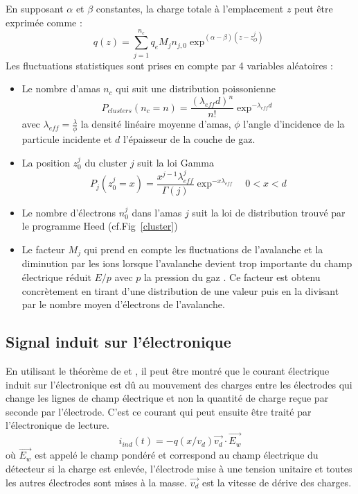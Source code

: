En supposant $\alpha$ et $\beta$ constantes, la charge totale à l'emplacement $z$ peut être exprimée comme :
\begin{equation}
q(z)=\sum_{j=1}^{n_c}q_{e}M_{j}n_{j,0}\exp^{(\alpha-\beta)(z-z_O^j)}
\end{equation}
\newpage
Les fluctuations statistiques sont prises en compte par \num{4} variables aléatoires :
\begin{itemize}[label=$\bullet$]
	\item Le nombre d'amas $n_c$ qui suit une distribution poissonienne 
	\begin{equation}
	P_{clusters}(n_c=n)=\frac{(\lambda_{eff}d)^{n}}{n!}\exp^{-\lambda_{eff}d}
	\end{equation}
	avec $\lambda_{eff}=\frac{\lambda}{\phi}$ la densité linéaire moyenne d'amas, $\phi$ l'angle d'incidence de la particule incidente et $d$ l'épaisseur de la couche de gaz.
	\item La position $z_0^j$ du cluster $j$ suit la loi Gamma
	\begin{equation}
	P_{j}(z_0^j=x)=\frac{x^{j-1}\lambda_{eff}^{j}}{\Gamma(j)}\exp^{-x\lambda_{eff}} \quad 0<x<d
	\end{equation}
	\item Le nombre d'électrons $n_{0}^{j}$ dans l'amas $j$ suit la loi de distribution trouvé par le programme Heed (cf.Fig~\ref{cluster}) 
	\item Le facteur $M_{j}$ qui prend en compte les fluctuations de l'avalanche et la diminution par les ions lorsque l'avalanche devient trop importante du champ électrique réduit $E/p$ avec $p$ la pression du gaz . Ce facteur est obtenu concrètement en tirant d'une distribution de  une valeur puis en la divisant par le nombre moyen d'électrons de l'avalanche.
\end{itemize}
\vspace*{-0.2cm}
\subsection{Signal induit sur l'électronique}
\vspace*{-0.6cm}
En utilisant le théorème de  et  \cite{HE2001250}, il peut être montré que le courant électrique induit sur l'électronique est dû au mouvement des charges entre les électrodes qui change les lignes de champ électrique et non la quantité de charge reçue par seconde par l'électrode. C'est ce courant qui peut ensuite être traité par l'électronique de lecture.
\begin{equation}
i_{ind}(t)=-q(x/v_{d})\vec{v_{d}}\cdot \overrightarrow{E_{w}}
\end{equation}
où $\overrightarrow{E_{w}}$ est appelé le champ pondéré et correspond au champ électrique du détecteur si la charge est enlevée, l'électrode mise à une tension unitaire  et toutes les autres électrodes sont mises à la masse. $\vec{v_{d}}$ est la vitesse de dérive des charges.

